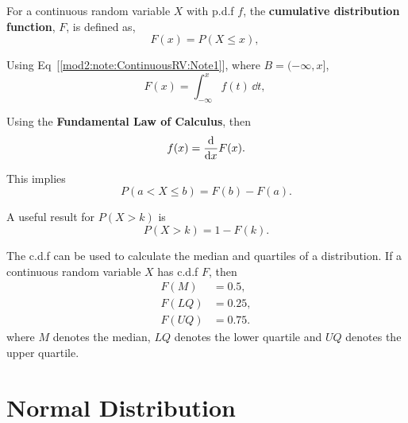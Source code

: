 \begin{defn} \label{mod2:defn:ContinuousRV:CDF}
	For a continuous random variable $X$ with p.d.f $f$,  the \textbf{cumulative distribution function}, $F$, is defined as,
	\begin{equation}
		F(x) = P(X \leq x), \
	\end{equation}
	
	Using Eq~[\ref{mod2:note:ContinuousRV:Note1}], where $B = (-\infty, x]$,
	\begin{equation}
		F(x) = \int_{-\infty}^{x} f(t)\,\dd t, \
	\end{equation}
	
	Using the \textbf{Fundamental Law of Calculus}, then
	\begin{equation}
	f(x) = \frac{\mathrm{d}}{\mathrm{d}x}F(x)
.	\end{equation}
	
	
\end{defn}	

\begin{note} \label{mod2:note:ContinuousRV:CDF}
	This implies
	\begin{equation}
		P( a < X \leq b) = F(b) - F(a).
	\end{equation}
\end{note}

\begin{note} \label{mod2:note:ContinuousRV:CDF2}
	A useful result for $P(X>k)$ is
	\begin{equation}
		P(X>k) = 1 - F(k).
	\end{equation}	
\end{note}


\begin{prop} \label{mod2:prop:ContinuousRV:CDF}
	The c.d.f can be used to calculate the median and quartiles of a distribution. If a continuous random variable $X$ has c.d.f $F$,  then 
	\begin{align}
	F(M) &= 0.5, \\
	F(LQ) &= 0.25, \\
	F(UQ) &= 0.75.
	\end{align}	
	where $M$ denotes the median, $LQ$ denotes the lower quartile and $UQ$ denotes the upper quartile.
\end{prop}
		




\section{Normal Distribution}\label{mod2:section:Normal}

